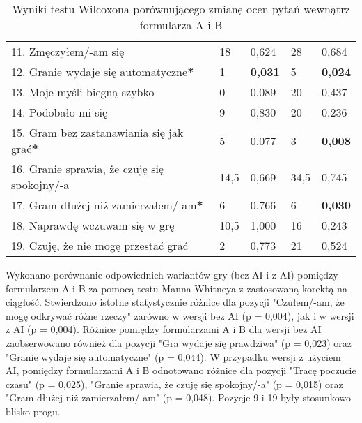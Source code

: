 \begin{table}[!h]
\begin{center}
\begin{tabular}{|m{12em}|m{5em}|m{4em}|m{5em}|m{4em}|}
            11. Zmęczyłem/-am się                                             & 18                     & 0,624          & 28                     & 0,684          \\
            12. Granie wydaje się automatyczne\textbf{*}                      & 1                      & \textbf{0,031} & 5                      & \textbf{0,024} \\
            13. Moje myśli \newline biegną szybko                             & 0                      & 0,089          & 20                     & 0,437          \\
            14. Podobało mi się                                               & 9                      & 0,830          & 20                     & 0,236          \\
            15. Gram bez zastanawiania się jak grać\textbf{*}                 & 5                      & 0,077          & 3                      & \textbf{0,008} \\
            16. Granie sprawia, \newline że czuję się spokojny/-a             & 14,5                   & 0,669          & 34,5                   & 0,745          \\
            17. Gram dłużej \newline niż zamierzałem/-am\textbf{*}            & 6                      & 0,766          & 6                      & \textbf{0,030} \\
            18. Naprawdę wczuwam się w grę                                    & 10,5                   & 1,000          & 16                     & 0,243          \\
            19. Czuję, że nie mogę przestać grać                              & 2                      & 0,773          & 21                     & 0,524          \\
            \hline
        \end{tabular}
    \end{center}
    \caption{Wyniki testu Wilcoxona porównującego zmianę ocen pytań wewnątrz formularza A i B}\label{tab1:ch7_13}
\end{table}

\newpage

Wykonano porównanie odpowiednich wariantów gry (bez AI i z AI) pomiędzy formularzem A i B za pomocą testu
Manna-Whitneya z zastosowaną korektą na ciągłość. Stwierdzono istotne statystycznie różnice dla pozycji "Czułem/-am, że mogę odkrywać różne rzeczy"
zarówno w wersji bez AI (p = 0,004), jak i w wersji z AI (p = 0,004). Różnice pomiędzy formularzami
A i B dla wersji bez AI zaobserwowano również dla pozycji "Gra wydaje się prawdziwa" (p = 0,023) oraz "Granie wydaje
się automatyczne" (p = 0,044). W przypadku wersji z użyciem AI, pomiędzy formularzami A i B odnotowano różnice dla
pozycji "Tracę poczucie czasu" (p = 0,025), "Granie sprawia, że czuję się spokojny/-a" (p = 0,015) oraz "Gram
dłużej niż zamierzałem/-am" (p = 0,048). Pozycje 9 i 19 były stosunkowo blisko progu.

